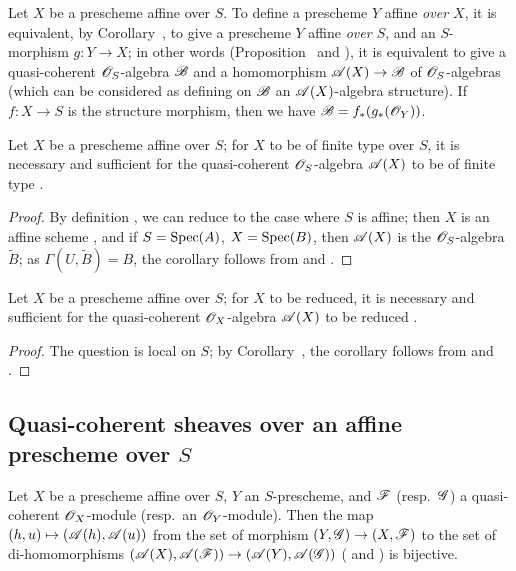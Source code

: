 \begin{env}[1.3.6]
\label{II.1.3.6}
Let $X$ be a prescheme affine over $S$.
To define a prescheme $Y$ affine \emph{over $X$}, it is equivalent, by Corollary~, to give a prescheme $Y$ affine \emph{over $S$}, and an $S$-morphism $g:Y\to X$; in other words (Proposition~ and ), it is equivalent to give a quasi-coherent $\mathscr{O}_S$-algebra $\mathscr{B}$ and a homomorphism $\sh{A}(X)\to\sh{B}$ of $\mathscr{O}_S$-algebras (which can be considered as defining on $\mathscr{B}$ an $\mathscr{A}(X)$-algebra structure).
If $f:X\to S$ is the structure morphism, then we have $\mathscr{B}=f_*(g_*(\mathscr{O}_Y))$.
\end{env}

\begin{corollary}[1.3.7]
\label{II.1.3.7}
Let $X$ be a prescheme affine over $S$; for $X$ to be of finite type over $S$, it is necessary and sufficient for the quasi-coherent $\mathscr{O}_S$-algebra $\mathscr{A}(X)$ to be of finite type .
\end{corollary}

\begin{proof}
By definition , we can reduce to the case where $S$ is affine; then $X$ is an affine scheme , and if $S=\operatorname{Spec}(A)$, $X=\operatorname{Spec}(B)$, then $\mathscr{A}(X)$ is the $\mathscr{O}_S$-algebra $\widetilde{B}$; as $\Gamma(U,\widetilde{B})=B$, the corollary follows from  and .
\end{proof}

\begin{corollary}[1.3.8]
\label{II.1.3.8}
Let $X$ be a prescheme affine over $S$; for $X$ to be reduced, it is necessary and sufficient for the quasi-coherent $\mathscr{O}_X$-algebra $\mathscr{A}(X)$ to be reduced .
\end{corollary}

\begin{proof}
The question is local on $S$; by Corollary~, the corollary follows from  and .
\end{proof}

\subsection{Quasi-coherent sheaves over an affine prescheme over $S$}
\label{subsection:II.1.4}

\begin{proposition}[1.4.1]
\label{II.1.4.1}
Let $X$ be a prescheme affine over $S$, $Y$ an $S$-prescheme, and $\mathscr{F}$ (resp.~$\mathscr{G}$) a quasi-coherent $\mathscr{O}_X$-module (resp.~an $\mathscr{O}_Y$-module).
Then the map $(h,u)\mapsto(\sh{A}(h),\sh{A}(u))$ from the set of morphism $(Y,\sh{G})\to(X,\sh{F})$ to the set of di-homomorphisms $(\sh{A}(X),\sh{A}(\sh{F}))\to(\sh{A}(Y),\sh{A}(\sh{G}))$ ( and ) is bijective.
\end{proposition}

